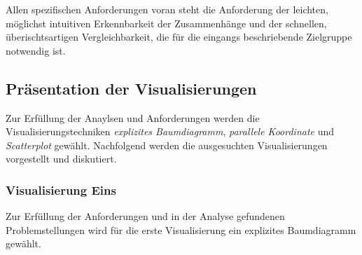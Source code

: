 \documentclass[usegeometry=true]{scrartcl}
\begin{document}
Allen spezifischen Anforderungen voran steht die Anforderung der leichten, möglichst intuitiven Erkennbarkeit der Zusammenhänge und der schnellen, überischtsartigen Vergleichbarkeit,
die für die eingangs beschriebende Zielgruppe notwendig ist.
\subsection{Präsentation der Visualisierungen}
Zur Erfüllung der Anaylsen und Anforderungen werden die Visualisierungstechniken \textit{explizites Baumdiagramm}, \textit{parallele Koordinate} und \textit{Scatterplot} gewählt.
Nachfolgend werden die ausgesuchten Visualisierungen vorgestellt und diskutiert. 

\subsubsection{Visualisierung Eins}
Zur Erfüllung der Anforderungen und in der Analyse gefundenen Problemstellungen wird für die erste Visualisierung ein explizites Baumdiagramm gewählt.
\end{document}
